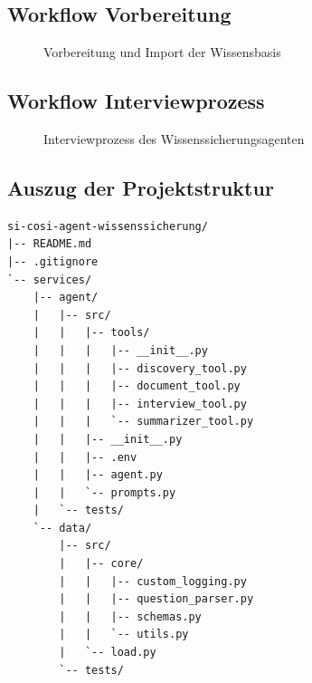 \documentclass[
  10pt,
  ngerman,
  a4paper,
  toc=graduated,
  numbers=noenddot,
  headings=standardclasses,
  nonumberlist
]{scrartcl}
\begin{document}
\newpage
\subsection{Workflow Vorbereitung}
\label{anhang_workflow_vorbereitung}

\begin{figure}[H]
    \centering
    
    \caption{Vorbereitung und Import der Wissensbasis}
    \label{fig:workflow_vorbereitung}
\end{figure}

\newpage
\subsection{Workflow Interviewprozess}
\label{anhang_workflow_interviewprozess}

\begin{figure}[H]
    \centering
    
    \caption{Interviewprozess des Wissenssicherungsagenten}
    \label{fig:workflow_interviewprozess}
\end{figure}

\newpage
\subsection{Auszug der Projektstruktur}
\label{anhang_projektstruktur}

\begin{lstlisting}[style=basecode, numbers=none, caption={Auszug der Projekt- und Ordnerstruktur des Wissenssicherungsagenten}, label={lst:projektstruktur}]
si-cosi-agent-wissenssicherung/
|-- README.md
|-- .gitignore
`-- services/
    |-- agent/
    |   |-- src/
    |   |   |-- tools/
    |   |   |   |-- __init__.py
    |   |   |   |-- discovery_tool.py
    |   |   |   |-- document_tool.py
    |   |   |   |-- interview_tool.py
    |   |   |   `-- summarizer_tool.py
    |   |   |-- __init__.py
    |   |   |-- .env
    |   |   |-- agent.py
    |   |   `-- prompts.py
    |   `-- tests/
    `-- data/
        |-- src/
        |   |-- core/
        |   |   |-- custom_logging.py
        |   |   |-- question_parser.py
        |   |   |-- schemas.py
        |   |   `-- utils.py
        |   `-- load.py
        `-- tests/
\end{lstlisting}
\end{document}
